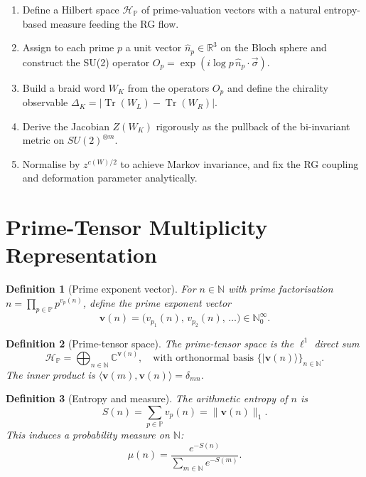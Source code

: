 \documentclass[11pt]{article}
\newtheorem{definition}{Definition}[section]
\newcommand{\PP}{\mathbb{P}}
\newcommand{\NN}{\mathbb{N}}
\newcommand{\RR}{\mathbb{R}}
\newcommand{\CC}{\mathbb{C}}
\newcommand{\Tr}{\operatorname{Tr}}
\newcommand{\hatN}[1]{\hat{n}_{#1}}
\begin{document}
\begin{enumerate}
  \item Define a Hilbert space $\mathcal{H}_\PP$ of prime-valuation vectors with a natural entropy-based measure feeding the RG flow.
  \item Assign to each prime $p$ a unit vector $\hatN{p}\in\RR^3$ on the Bloch sphere and construct the SU(2) operator $O_p=\exp(i\log p\,\hatN{p}\cdot\vec{\sigma})$.
  \item Build a braid word $W_K$ from the operators $O_p$ and define the chirality observable $\Delta_K = |\Tr(W_L)-\Tr(W_R)|$.
  \item Derive the Jacobian $Z(W_K)$ rigorously as the pullback of the bi-invariant metric on $SU(2)^{\otimes m}$.
  \item Normalise by $z^{c(W)/2}$ to achieve Markov invariance, and fix the RG coupling and deformation parameter analytically.
\end{enumerate}

\section{Prime-Tensor Multiplicity Representation}

\begin{definition}[Prime exponent vector]
For $n\in\NN$ with prime factorisation $n=\prod_{p\in\PP} p^{v_p(n)}$, define the \emph{prime exponent vector}
\[
\mathbf{v}(n) = \bigl(v_{p_1}(n),\,v_{p_2}(n),\,\dots\bigr)\in\NN_0^\infty.
\]
\end{definition}

\begin{definition}[Prime-tensor space]
The \emph{prime-tensor space} is the $\ell^1$ direct sum
\[
\mathcal{H}_\PP = \bigoplus_{n\in\NN}\CC^{\mathbf{v}(n)},
\quad\text{with orthonormal basis }\bigl\{|\mathbf{v}(n)\rangle\bigr\}_{n\in\NN}.
\]
The inner product is $\langle\mathbf{v}(m),\mathbf{v}(n)\rangle = \delta_{mn}$.
\end{definition}

\begin{definition}[Entropy and measure]
The \emph{arithmetic entropy} of $n$ is
\[
S(n) = \sum_{p\in\PP} v_p(n) = \|\mathbf{v}(n)\|_1.
\]
This induces a probability measure on $\NN$:
\[
\mu(n) = \frac{e^{-S(n)}}{\sum_{m\in\NN}e^{-S(m)}}.
\]
\end{definition}
\end{document}
